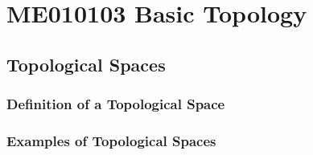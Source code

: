 



\part{ME010103 Basic Topology}
\chapter{Topological Spaces}
\section{Definition of a Topological Space}
\section{Examples of Topological Spaces}
